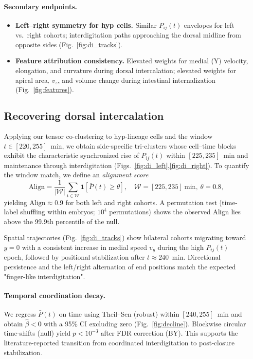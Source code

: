 \documentclass[unnumsec,webpdf,modern,large,namedate]{oup-authoring-template}%
\theoremstyle{thmstyleone}\newtheorem{theorem}{Theorem}
\theoremstyle{thmstyletwo}\newtheorem{example}{Example}
\theoremstyle{thmstylethree}\newtheorem{definition}{Definition}
\begin{document}
\paragraph{Secondary endpoints.}
\begin{itemize}
\item \textbf{Left--right symmetry for hyp cells.} Similar $P_{ij}(t)$ envelopes for left vs.~right cohorts; interdigitation paths approaching the dorsal midline from opposite sides (Fig.~\ref{fig:di_tracks}).
\item \textbf{Feature attribution consistency.} Elevated weights for medial (Y) velocity, elongation, and curvature during dorsal intercalation; elevated weights for apical area, $v_z$, and volume change during intestinal internalization (Fig.~\ref{fig:features}).
\end{itemize}

\subsection{Recovering dorsal intercalation}
\label{subsec:val_dorsal}
Applying our tensor co-clustering to hyp-lineage cells and the window $t\in[220,255]$~min, we obtain side-specific tri-clusters whose cell--time blocks exhibit the characteristic synchronized rise of $P_{ij}(t)$ within $[225,235]$~min and maintenance through interdigitation (Figs.~\ref{fig:di_left},\ref{fig:di_right}). To quantify the window match, we define an \emph{alignment score}
\begin{equation}
\mathrm{Align}=\frac{1}{|\mathcal{W}|}\sum_{t\in\mathcal{W}}\mathbf{1}\!\left[\bar{P}(t)\geq \theta\right],\quad \mathcal{W}=[225,235]\ \mathrm{min},\ \theta=0.8,
\label{eq:align}
\end{equation}
yielding $\mathrm{Align}\approx 0.9$ for both left and right cohorts. A permutation test (time-label shuffling within embryos; $10^4$ permutations) shows the observed $\mathrm{Align}$ lies above the 99.9th percentile of the null.

Spatial trajectories (Fig.~\ref{fig:di_tracks}) show bilateral cohorts migrating toward $y=0$ with a consistent increase in medial speed $v_y$ during the high $P_{ij}(t)$ epoch, followed by positional stabilization after $t\approx 240$~min. Directional persistence and the left/right alternation of end positions match the expected "finger-like interdigitation".

\paragraph{Temporal coordination decay.}
We regress $\bar{P}(t)$ on time using Theil–Sen (robust) within $[240,255]$~min and obtain $\hat{\beta}<0$ with a 95\% CI excluding zero (Fig.~\ref{fig:decline}). Blockwise circular time-shifts (null) yield $p<10^{-3}$ after FDR correction (BY). This supports the literature-reported transition from coordinated interdigitation to post-closure stabilization.
\end{document}
